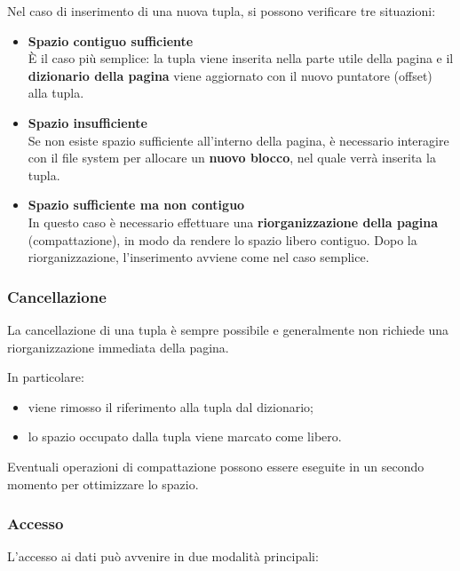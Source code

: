 Nel caso di inserimento di una nuova tupla, si possono verificare tre situazioni:

\begin{itemize}
	\item \textbf{Spazio contiguo sufficiente} \\
	È il caso più semplice: la tupla viene inserita nella parte utile della pagina e il \textbf{dizionario della pagina} viene aggiornato con il nuovo puntatore (offset) alla tupla.
	
	\item \textbf{Spazio insufficiente} \\
	Se non esiste spazio sufficiente all'interno della pagina, è necessario interagire con il file system per allocare un \textbf{nuovo blocco}, nel quale verrà inserita la tupla.
	
	\item \textbf{Spazio sufficiente ma non contiguo} \\
	In questo caso è necessario effettuare una \textbf{riorganizzazione della pagina} (compattazione), in modo da rendere lo spazio libero contiguo. 
	Dopo la riorganizzazione, l'inserimento avviene come nel caso semplice.
\end{itemize}

\subsubsection{Cancellazione}

La cancellazione di una tupla è sempre possibile e generalmente non richiede una riorganizzazione immediata della pagina.

In particolare:
\begin{itemize}
	\item viene rimosso il riferimento alla tupla dal dizionario;
	\item lo spazio occupato dalla tupla viene marcato come libero.
\end{itemize}

Eventuali operazioni di compattazione possono essere eseguite in un secondo momento per ottimizzare lo spazio.

\subsubsection{Accesso}

L'accesso ai dati può avvenire in due modalità principali:

